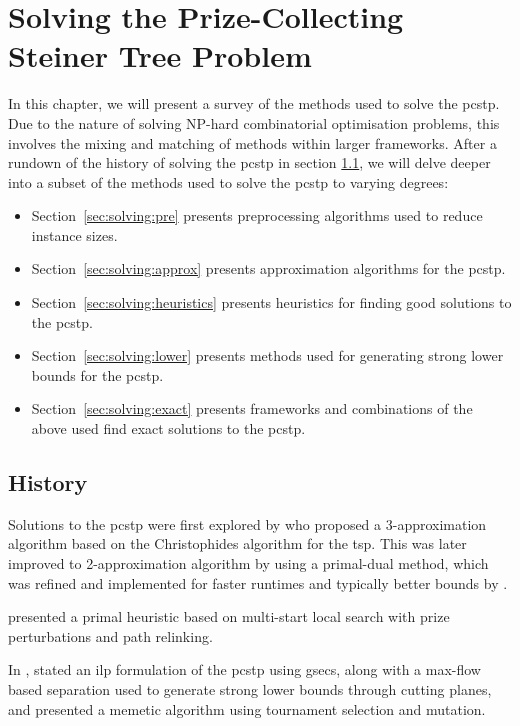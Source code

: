 \chapter{Solving the Prize-Collecting Steiner Tree Problem}
\label{chap:solving}

In this chapter, we will present a survey of the methods used to solve the \gls{pcstp}. Due to the nature of solving
NP-hard combinatorial optimisation problems, this involves the mixing and matching of methods within larger frameworks.
 After a rundown of the history of solving the \gls{pcstp} in section \ref{sec:solving:history}, we will delve deeper into a subset of the methods used to solve the \gls{pcstp} to varying degrees:
\begin{itemize}
\item Section~\ref{sec:solving:pre} presents preprocessing algorithms used to reduce instance sizes.
\item Section~\ref{sec:solving:approx} presents approximation algorithms for the \gls{pcstp}.
\item Section~\ref{sec:solving:heuristics} presents heuristics for finding good solutions to the \gls{pcstp}.
\item Section~\ref{sec:solving:lower} presents methods used for generating strong lower bounds for the \gls{pcstp}.
\item Section~\ref{sec:solving:exact} presents frameworks and combinations of the above used find exact solutions
   to the \gls{pcstp}.
\end{itemize}

\section{History}
\label{sec:solving:history}

Solutions to the \gls{pcstp} were first explored by \citet{Bienstock1993} who
proposed a 3-approximation algorithm based on the Christophides algorithm for the \gls{tsp}.
This was later improved to 2-approximation algorithm by
\citet{goemans1997primal} using a primal-dual method,
which was refined and implemented
for faster runtimes and typically better
bounds by \citet{Johnson:2000:PCS:338219.338637}.

\citet{canuto2001local} presented a primal heuristic based on multi-start
local search with prize perturbations and path relinking.

 In \citeyear{lucena2004strong}, \citet{lucena2004strong} stated an \gls{ilp} formulation of the \gls{pcstp} using \glspl{gsec},
along with a max-flow based separation used to generate strong lower bounds through cutting planes, and
\citet{Ljubic:2004:memetic}
 presented a memetic algorithm using tournament selection and mutation.

